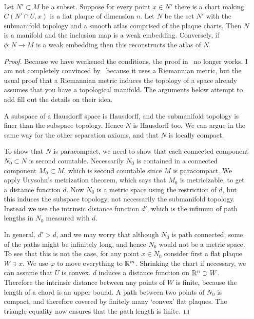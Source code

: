 \begin{theorem}
\label{thm:weakly embedded submanifold}
\textup{\cite[Thm~1.2.7]{Sharpe1997}\cite[Lems~I.2.15--17]{Kolar1993}} \\
Let $N' \subset M$ be a subset.
Suppose for every point $x \in N'$ there is a chart making $C(N'\cap U,x)$ is a flat plaque of dimension $n$.
Let $N$ be the set $N'$ with the submanifold topology and a smooth atlas comprised of the plaque charts.
Then $N$ is a manifold and the inclusion map is a weak embedding.
Conversely, if $\phi : N \to M$ is a weak embedding then this reconstructs the atlas of $N$.
\end{theorem}
\begin{proof}
Because we have weakened the conditions, the proof in~\cite[Thm~1.2.7(i)]{Sharpe1997} no longer works.
I am not completely convinced by~\cite[Lems~I.2.15--17]{Kolar1993} because it uses a Riemannian metric, but the usual proof that a Riemannian metric induces the topology of a space already assumes that you have a topological manifold.
The arguments below attempt to add fill out the details on their idea.

A subspace of a Hausdorff space is Hausdorff, and the submanifold topology is finer than the subspace topology.
Hence $N$ is Hausdorff too.
We can argue in the same way for the other separation axioms, and that $N$ is locally compact.

To show that $N$ is paracompact, we need to show that each connected component $N_0 \subset N$ is second countable.
Necessarily $N_0$ is contained in a connected component $M_0 \subset M$, which is second countable since $M$ is paracompact.
We apply Urysohn's metrization theorem, which says that $M_0$ is metricizable, to get a distance function $d$.
Now $N_0$ is a metric space using the restriction of $d$, but this induces the subspace topology, not necessarily the submanifold topology.
Instead we use the intrinsic distance function $d'$, which is the infimum of path lengths in $N_0$ measured with $d$.

In general, $d' > d$, and we may worry that although $N_0$ is path connected, some of the paths might be infinitely long, and hence $N_0$ would not be a metric space.
To see that this is not the case, for any point $x \in N_0$ consider first a flat plaque $W \ni x$.
We use $\varphi$ to move everything to $\mathbb{R}^m$.
Shrinking the chart if necessary, we can assume that $U$ is convex.
$d$ induces a distance function on $\mathbb{R}^n \supset W$.
Therefore the intrinsic distance between any points of $W$ is finite, because the length of a chord is an upper bound.
A path between two points of $N_0$ is compact, and therefore covered by finitely many `convex' flat plaques.
The triangle equality now ensures that the path length is finite.


\end{proof}
